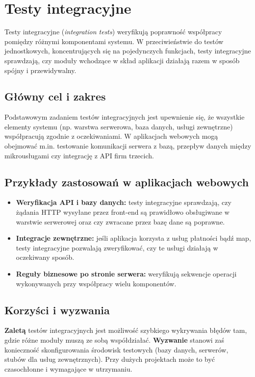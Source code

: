 \documentclass[12pt]{report}
\begin{document}
\section{Testy integracyjne}
\label{sec:testy-integracyjne}
Testy integracyjne (\emph{integration tests}) weryfikują poprawność współpracy pomiędzy różnymi komponentami systemu. W przeciwieństwie do testów jednostkowych, koncentrujących się na pojedynczych funkcjach, testy integracyjne sprawdzają, czy moduły wchodzące w skład aplikacji działają razem w sposób spójny i przewidywalny.

\subsection*{Główny cel i zakres}
Podstawowym zadaniem testów integracyjnych jest upewnienie się, że wszystkie elementy systemu (np. warstwa serwerowa, baza danych, usługi zewnętrzne) współpracują zgodnie z oczekiwaniami. W aplikacjach webowych mogą obejmować m.in. testowanie komunikacji serwera z bazą, przepływ danych między mikrousługami czy integrację z API firm trzecich.

\subsection*{Przykłady zastosowań w aplikacjach webowych}
\begin{itemize}
    \item \textbf{Weryfikacja API i bazy danych:} testy integracyjne sprawdzają, czy żądania HTTP wysyłane przez front-end są prawidłowo obsługiwane w warstwie serwerowej oraz czy zwracane przez bazę dane są poprawne.
    \item \textbf{Integracje zewnętrzne:} jeśli aplikacja korzysta z usług płatności bądź map, testy integracyjne pozwalają zweryfikować, czy te usługi działają w oczekiwany sposób.
    \item \textbf{Reguły biznesowe po stronie serwera:} weryfikują sekwencje operacji wykonywanych przy współpracy wielu komponentów.
\end{itemize}

\subsection*{Korzyści i wyzwania}
\textbf{Zaletą} testów integracyjnych jest możliwość szybkiego wykrywania błędów tam, gdzie różne moduły muszą ze sobą współdziałać. \textbf{Wyzwanie} stanowi zaś konieczność skonfigurowania środowisk testowych (bazy danych, serwerów, stubów dla usług zewnętrznych). Przy dużych projektach może to być czasochłonne i wymagające w utrzymaniu.
\end{document}
